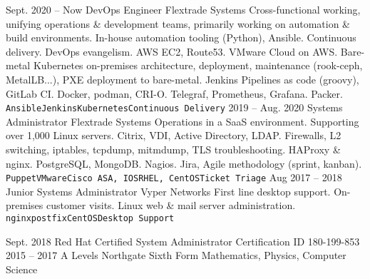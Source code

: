 \documentclass[9pt]{developercv} %
\begin{document}
\vspace{0.5cm}


\begin{entrylist}
	\entry
		{Sept. 2020 -- Now}
		{DevOps Engineer}
		{Flextrade Systems}
    {Cross-functional working, unifying operations \& development teams, primarily working on automation \& build environments. In-house automation tooling (Python), Ansible. Continuous delivery. DevOps evangelism. AWS EC2, Route53. VMware Cloud on AWS. Bare-metal Kubernetes on-premises architecture, deployment, maintenance (rook-ceph, MetalLB...), PXE deployment to bare-metal. Jenkins Pipelines as code (groovy), GitLab CI. Docker, podman, CRI-O. Telegraf, Prometheus, Grafana. Packer.\\ \texttt{Ansible}\slashsep\texttt{Jenkins}\slashsep\texttt{Kubernetes}\slashsep\texttt{Continuous Delivery}}
	\entry
		{2019 -- Aug. 2020}
		{Systems Administrator}
		{Flextrade Systems}
    {Operations in a SaaS environment. Supporting over 1,000 Linux servers. Citrix, VDI, Active Directory, LDAP. Firewalls, L2 switching, iptables, tcpdump, mitmdump, TLS troubleshooting. HAProxy \& nginx. PostgreSQL, MongoDB. Nagios. Jira, Agile methodology (sprint, kanban).\\ \texttt{Puppet}\slashsep\texttt{VMware}\slashsep\texttt{Cisco ASA, IOS}\slashsep\texttt{RHEL, CentOS}\slashsep\texttt{Ticket Triage}}
	\entry
		{Aug 2017 -- 2018}
		{Junior Systems Administrator}
		{Vyper Networks}
    {First line desktop support. On-premises customer visits. Linux web \& mail server administration.\\ \texttt{nginx}\slashsep\texttt{postfix}\slashsep\texttt{CentOS}\slashsep\texttt{Desktop Support}}
\end{entrylist}



\begin{entrylist}
	\entry
		{Sept. 2018}
		{Red Hat Certified System Administrator}
		{Certification ID 180-199-853}
    {}
	\entry
		{2015 -- 2017}
		{A Levels}
		{Northgate Sixth Form}
		{Mathematics, Physics, Computer Science}
\end{entrylist}
\end{document}
